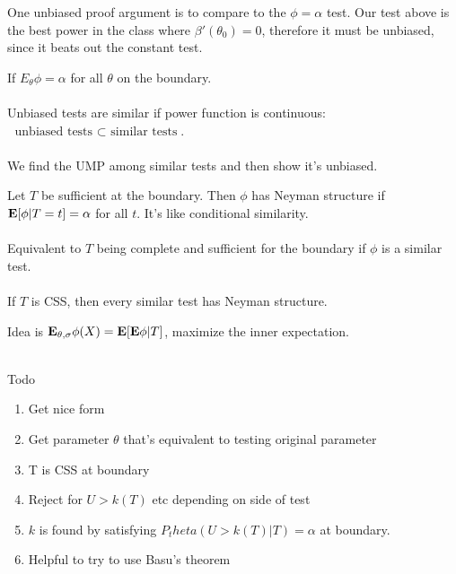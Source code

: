 \documentclass{article}
\begin{document}
One unbiased proof argument is to compare to the $\phi = \alpha$ test. Our test above is the best power in the class where $\beta'(\theta_0) = 0$, therefore it must be unbiased, since it beats out the constant test.


\begin{definition}
If $E_\theta \phi = \alpha$ for all $\theta$ on the boundary. \\\\
Unbiased tests are similar if power function is continuous: $\text{ unbiased tests } \subset \text{ similar tests}$.\\\\
We find the UMP among similar tests and then show it's unbiased.
\end{definition}
\begin{definition}
Let $T$ be sufficient at the boundary. Then $\phi$ has Neyman structure if $\mathbf{E} [\phi | T=t] = \alpha$ for all $t$. It's like conditional similarity. \\\\

Equivalent to $T$ being complete and sufficient for the boundary if $\phi$ is a similar test. \\\\

If $T$ is CSS, then every similar test has Neyman structure. 
\end{definition}

Idea is $\mathbf{E}_{\theta, \sigma} \phi (X) = \mathbf{E} [\mathbf{E} \phi | T] $, maximize the inner expectation. \\\\

\begin{recipe}
Todo
\begin{enumerate}
	\item Get nice form
	\item Get parameter $\theta$ that's equivalent to testing original parameter
	\item T is CSS at boundary 
	\item Reject for $U > k(T)$ etc depending on side of test
	\item $k$ is found by satisfying $P_theta (U > k(T) | T) = \alpha$ at boundary. 
	\item Helpful to try to use Basu's theorem 
\end{enumerate}
\end{recipe}
\end{document}
